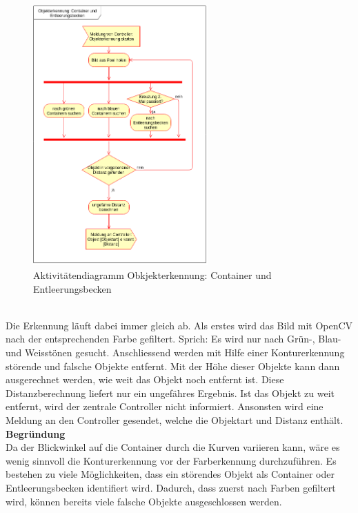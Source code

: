 \begin{figure}[h!]%
\centering
\includegraphics[width=0.6\textwidth]{03_Loesungskonzept/pictures/objekterkennung_containers.png}
\caption{Aktivitätendiagramm Obkjekterkennung: Container und Entleerungsbecken}
\label{fig:activityContainer}
\end{figure}\\
Die Erkennung läuft dabei immer gleich ab. Als erstes wird das Bild mit OpenCV nach der entsprechenden Farbe gefiltert. Sprich: Es wird nur nach Grün-, Blau- und Weisstönen gesucht. Anschliessend werden mit Hilfe einer Konturerkennung störende und falsche Objekte entfernt. Mit der Höhe dieser Objekte kann dann ausgerechnet werden, wie weit das Objekt  noch entfernt ist. Diese Distanzberechnung liefert nur ein ungefähres Ergebnis. Ist das Objekt zu weit entfernt, wird der zentrale Controller nicht informiert. Ansonsten wird eine Meldung an den Controller gesendet, welche die Objektart und Distanz enthält.
\\[0.2cm]
\textbf{Begründung}\\
Da der Blickwinkel auf die Container durch die Kurven variieren kann, wäre es wenig sinnvoll die Konturerkennung vor der Farberkennung durchzuführen. Es bestehen zu viele Möglichkeiten, dass ein störendes Objekt als Container oder Entleerungsbecken identifiert wird. Dadurch, dass zuerst nach Farben gefiltert wird, können bereits viele falsche Objekte ausgeschlossen werden. \\
